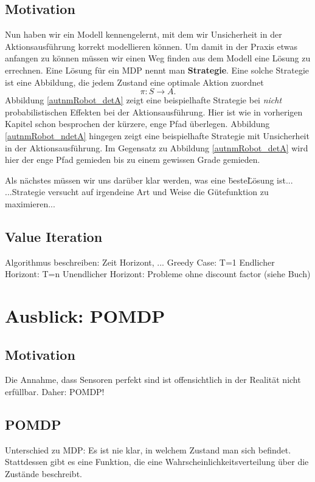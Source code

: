 \documentclass[a4paper]{IEEEtran}
\begin{document}
\subsection{Motivation}
Nun haben wir ein Modell kennengelernt, mit dem wir Unsicherheit in der Aktionsausführung korrekt modellieren können. Um damit in der Praxis etwas anfangen zu können müssen wir einen Weg finden aus dem Modell eine Lösung zu errechnen. Eine Lösung für ein MDP nennt man \textbf{Strategie}. Eine solche Strategie ist eine Abbildung, die jedem Zustand eine optimale Aktion zuordnet
\begin{equation}
	\pi: S \rightarrow A.
\end{equation}
Abbildung \ref{autnmRobot_detA} zeigt eine beispielhafte Strategie bei \emph{nicht} probabilistischen Effekten bei der Aktionsausführung. Hier ist wie in vorherigen Kapitel schon besprochen der kürzere, enge Pfad überlegen. Abbildung \ref{autnmRobot_ndetA} hingegen zeigt eine beispielhafte Strategie mit Unsicherheit in der Aktionsausführung. Im Gegensatz zu Abbildung \ref{autnmRobot_detA} wird hier der enge Pfad gemieden bis zu einem gewissen Grade gemieden.

Als nächstes müssen wir uns darüber klar werden, was eine \"beste\" Lösung ist...
...Strategie versucht auf irgendeine Art und Weise die Gütefunktion zu maximieren...

\subsection{Value Iteration} %
Algorithmus beschreiben: Zeit Horizont, ... %
Greedy Case: T=1
Endlicher Horizont: T=n
Unendlicher Horizont: Probleme ohne discount factor (siehe Buch)


\section{Ausblick: POMDP}
\subsection{Motivation}
Die Annahme, dass Sensoren perfekt sind ist offensichtlich in der Realität nicht erfüllbar. Daher: POMDP!

\subsection{POMDP}
Unterschied zu MDP: Es ist nie klar, in welchem Zustand man sich befindet. Stattdessen gibt es eine Funktion, die eine Wahrscheinlichkeitsverteilung über die Zustände beschreibt.
\end{document}
